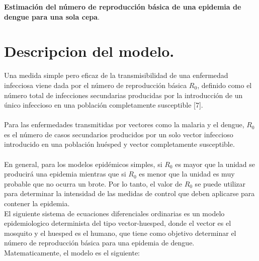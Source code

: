 \newpage	
	\begin{center}
		\Large
		\textbf{Estimación del número de reproducción básica de una epidemia de dengue para una sola cepa}.
	\end{center}
	\section{Descripcion del modelo.}
	
		Una medida simple pero eficaz de la transmisibilidad de una enfermedad infecciosa viene dada por el número de reproducción básica $R_0$, definido como el número total de infecciones secundarias producidas por la introducción de un único infeccioso en una población completamente susceptible [7]. \\
		\\
		Para las enfermedades transmitidas por vectores como la malaria y el dengue, $R_0$ es el número de casos secundarios producidos por un solo vector infeccioso introducido en una población huésped y vector completamente susceptible. \\
		\\
		En general, para los modelos epidémicos simples, si $R_0$ es mayor que la unidad se producirá una epidemia mientras que si $R_0$ es menor que la unidad es muy probable que no ocurra un brote. Por lo tanto, el valor de $R_0$ se puede utilizar para determinar la intensidad de las medidas de control que deben aplicarse para contener la epidemia.\\
		
		El siguiente sistema de ecuaciones diferenciales ordinarias es un modelo epidemiologico determinista del tipo vector-huesped, donde el vector es el mosquito y el huesped es el humano, que tiene como objetivo determinar el número de reproducción básica para una epidemia de dengue.\\
		
		Matematicamente, el modelo es el siguiente:
	
